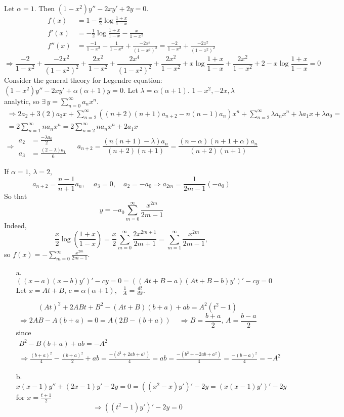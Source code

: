 \documentclass[twoside]{amsart}
\theoremstyle{plain}
\theoremstyle{definition}
\newcommand{\exercisehead}[1]
  {
   \noindent{\small\bf Exercise #1.}
   \smallskip}
\begin{document}
\exercisehead{2} Let $\alpha =1$.  Then $(1-x^2)y'' - 2xy' +2y =0$.  
\[
\begin{aligned}
  f(x) & = 1 - \frac{x}{2} \log{ \frac{1+x}{1-x} } \\ 
  f'(x) & = - \frac{1}{2} \log{ \frac{ 1 + x}{1-x} } - \frac{x}{1-x^2} \\ 
  f''(x) & = \frac{-1}{1-x^2} - \frac{1}{1-x^2} + \frac{ - 2x^2}{(1-x^2)^2} = \frac{-2}{1-x^2} + \frac{-2x^2}{(1-x^2)^2}
\end{aligned}
\]
\[
\Longrightarrow \frac{-2}{1-x^2} + \frac{-2x^2}{ (1-x^2)^2} + \frac{2x^2}{1-x^2} + \frac{ 2x^4}{ (1-x^2)^2} + \frac{2x^2}{1-x^2} + x\log{ \frac{1+x}{1-x} } + \frac{2x^2}{1-x^2} + 2 - x \log{ \frac{1+x}{1-x} } = 0 
\]
Consider the general theory for Legendre equation: $ (1-x^2)y'' - 2xy' + \alpha (\alpha +1) y=0$.  Let $\lambda = \alpha (\alpha +1)$.  $1-x^2,-2x,\lambda$ analytic, so $\exists \, y = \sum_{n=0}^{\infty} a_n x^n$.  
\[
\begin{gathered}
  \Longrightarrow 2a_2 + 3(2) a_3 x + \sum_{n=2}^{\infty} ((n+2)(n+1)a_{n+2} - n(n-1) a_n) x^n + \sum_{n=2}^{\infty} \lambda a_n x^n + \lambda a_1 x + \lambda a_0 = \\
  = 2 \sum_{n=1}^{\infty} n a_n x^n = 2 \sum_{n=2}^{\infty} n a_n x^n + 2a_1 x
\end{gathered}
\]
\[
\Longrightarrow \begin{aligned} a_2 & = \frac{-\lambda a_0 }{2} \\ a_3 & = \frac{ (2-\lambda) a_1}{6} \end{aligned} \quad \, a_{n+2} = \frac{ (n(n+1)- \lambda )a_n}{ (n+2)(n+1)} = \frac{(n-\alpha)(n+1 + \alpha)a_n}{(n+2)(n+1)}
\]

If $\alpha =1$, $\lambda =2$, 
\[
a_{n+2} = \frac{n-1}{n+1} a_n, \quad \, a_3 =0, \quad a_2 = -a_0 \Longrightarrow a_{2m} = \frac{1}{2m-1} (-a_0)
\]
So that
\[
 y = -a_0 \sum_{m=0}^{\infty} \frac{x^{2m}}{ 2m-1} 
\]
Indeed,
\[
\frac{x}{2} \log{ \left( \frac{1+x}{1-x} \right) } = \frac{x}{2} \sum_{m=0}^{\infty} \frac{ 2x^{2m+1}}{ 2m+1} = \sum_{m=1}^{\infty} \frac{x^{2m}}{ 2m-1}, 
\]
so $f(x) = -\sum_{m=0}^{\infty} \frac{x^{2m}}{2m-1}$.  

\exercisehead{3} 
\begin{itemize}
\item[a.]
\[
((x-a)(x-b)y')' - cy =0 = ((At + B -a)(At + B-b)y')' -cy = 0 
\]
Let $x = At + B$, $c = \alpha (\alpha +1)$, \, $\frac{1}{A} = \frac{dt}{dx}$.  

\[
(At)^2 + 2ABt + B^2 - (At+B)(b+a) + ab = A^2 ( t^2-1)
\]
\[
\Longrightarrow 2AB - A(b+a) = 0 = A(2B- (b+a)) \quad \, \Longrightarrow \boxed{ B = \frac{b+a}{2}, \, A = \frac{b-a}{2} }
\]
since 
\[
\begin{gathered}
  B^2 - B(b+a) + ab = -A^2 \\ 
  \Longrightarrow \frac{ (b+a)^2}{4} - \frac{ (b+a)^2}{2} + ab = \frac{ - (b^2 + 2ab + a^2)}{4} = ab = \frac{ - (b^2 + -2ab+a^2) }{4} = \frac{ -(b-a)^2}{4} = -A^2
\end{gathered}
\]
\item[b.] \[
x(x-1)y'' + (2x-1) y' - 2y = 0 = ((x^2-x)y')' - 2y = (x(x-1)y')' - 2y
\]
for $x = \frac{t+1}{2}$
\[
\Longrightarrow ((t^2-1)y')' - 2y = 0
\]
\end{itemize}
\end{document}
